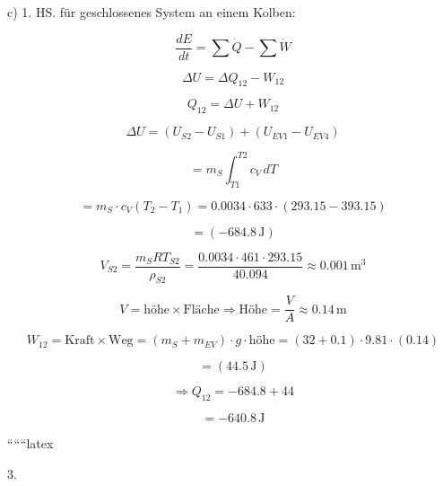c) 1. HS. für geschlossenes System an einem Kolben:

\[
\frac{dE}{dt} = \sum \dot{Q} - \sum \dot{W}
\]

\[
\Delta U = \Delta Q_{12} - W_{12}
\]

\[
Q_{12} = \Delta U + W_{12}
\]

\[
\Delta U = (U_{S2} - U_{S1}) + (U_{EV1} - U_{EV4})
\]

\[
= m_S \int_{T1}^{T2} c_V \, dT
\]

\[
= m_S \cdot c_V (T_2 - T_1) = 0.0034 \cdot 633 \cdot (293.15 - 393.15)
\]

\[
= (-684.8 \, \text{J})
\]

\[
V_{S2} = \frac{m_S R T_{S2}}{\rho_{S2}} = \frac{0.0034 \cdot 461 \cdot 293.15}{40.094} \approx 0.001 \, \text{m}^3
\]

\[
V = \text{höhe} \times \text{Fläche} \Rightarrow \text{Höhe} = \frac{V}{A} \approx 0.14 \, \text{m}
\]

\[
W_{12} = \text{Kraft} \times \text{Weg} = (m_S + m_{EV}) \cdot g \cdot \text{höhe} = (32 + 0.1) \cdot 9.81 \cdot (0.14)
\]

\[
= (44.5 \, \text{J})
\]

\[
\Rightarrow Q_{12} = -684.8 + 44
\]

\[
= -640.8 \, \text{J}
\]

``````latex


3.